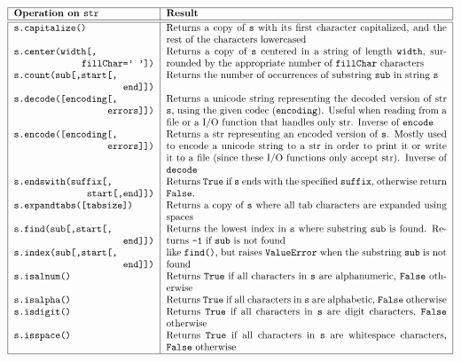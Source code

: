 $$\label{tab:chaines}\begin{tabular}{|p{5cm}|p{10cm}|}
\hline
\bf Operation on {\tt str}	&	\bf Result \\
\hline
\hline
\tt s.capitalize() 			& Returns a copy of {\tt s} with its first character capitalized, and the rest of the characters lowercased\\ 	 
\tt s.center(width[,\newline
\mbox{}\hfill fillChar=' ']) 		& Returns a copy of {\tt s} centered in a string of length {\tt width}, surrounded by the appropriate 
					  number of {\tt fillChar} characters\\ 	
\tt s.count(sub[,start[,\newline
\mbox{}\hfill end]]) 			& Returns the number of occurrences of substring {\tt sub} in string {\tt s}\\ 	
\tt s.decode([encoding[,\newline
\mbox{}\hfill errors]]) 		& Returns a unicode string representing the decoded version of str {\tt s}, 
					  using the given codec ({\tt encoding}). Useful when reading from a file 
					  or a I/O function that handles only str. Inverse of {\tt encode}\\	
\tt s.encode([encoding[,\newline
\mbox{}\hfill errors]]) 		& Returns a str representing an encoded version of {\tt s}. 
					  Mostly used to encode a unicode string to a str in order 
					  to print it or write it to a file (since these I/O functions
					  only accept str). Inverse of {\tt decode} \\	
\tt s.endswith(suffix[,\newline
\mbox{}\hfill start[,end]]) 		& Returns {\tt True} if {\tt s} ends with the specified {\tt suffix}, 
					  otherwise return {\tt False}.\\	
\tt s.expandtabs([tabsize]) 		& Returns a copy of {\tt s} where all tab characters are expanded using spaces\\ 	
\tt s.find(sub[,start[,\newline
\mbox{}\hfill end]]) 			& Returns the lowest index in {\tt s} where substring {\tt sub} is found. Returns {\tt -1} if {\tt sub} is not found\\ 	
\tt s.index(sub[,start[,\newline
\mbox{}\hfill end]]) 			& like {\tt find()}, but raises {\tt ValueError} when the substring {\tt sub} is not found\\	
\tt s.isalnum() 			& Returns {\tt True} if all characters in {\tt s} are alphanumeric, {\tt False} otherwise\\ 	
\tt s.isalpha() 			& Returns {\tt True} if all characters in {\tt s} are alphabetic, {\tt False} otherwise\\	
\tt s.isdigit() 			& Returns {\tt True} if all characters in {\tt s} are digit characters, {\tt False} otherwise\\ 	
\tt s.isspace() 			& Returns {\tt True} if all characters in {\tt s} are whitespace characters, {\tt False} otherwise\\ 	
\hline
\end{tabular}$$ 

